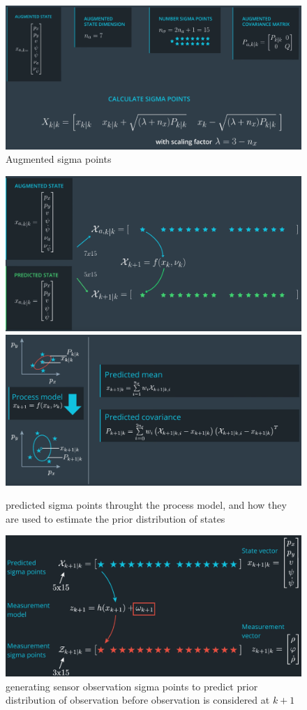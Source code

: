 \documentclass[a4paper,12pt]{article}
\begin{document}
\begin{figure}[h!]
  \caption{Augmented sigma points}
  \centering
    \includegraphics[scale=.15]{9.png}
\end{figure}
\begin{figure}[h!]
  \caption{predicted sigma points throught the process model, and how they are used to estimate the prior distribution of states}
  \centering
    \includegraphics[scale=.15]{10.png}
    \includegraphics[scale=.15]{11.png}
\end{figure}
\begin{figure}[h!]
  \caption{generating sensor observation sigma points to predict prior distribution of observation before observation is considered at $k+1$}
  \centering
    \includegraphics[scale=.2]{12.png}
\end{figure}
\end{document}
